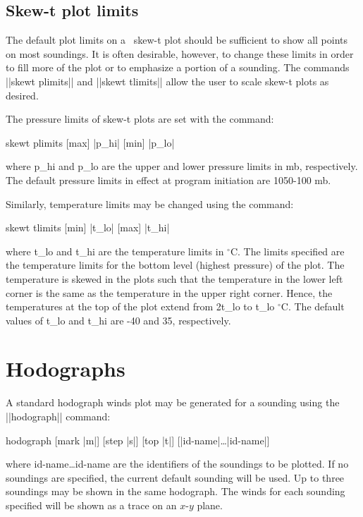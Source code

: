 \subsection{Skew-t plot limits}
The default plot limits on a \suds\ skew-t plot should be sufficient to show
all points on most soundings.  It is often desirable, however, to change these
limits in order to fill more of the plot or to emphasize a portion of a 
sounding.  The commands ||skewt plimits|| and ||skewt tlimits|| allow the 
user to scale skew-t plots as desired.

The pressure limits of skew-t plots are set with the command:
\begin{example}
	skewt plimits [max] |p_hi| [min] |p_lo|
\end{example}
where {\pf p\_hi} and {\pf p\_lo} are the upper and lower pressure limits
in mb, respectively.  The default pressure limits in effect at program
initiation are 1050-100 mb.

Similarly, temperature limits may be changed using the command:
\begin{example}
	skewt tlimits [min] |t_lo| [max] |t_hi|
\end{example}
where {\pf t\_lo} and {\pf t\_hi} are the temperature limits in $^\circ$C.
The limits specified are the temperature limits for the bottom level (highest
pressure) of the plot.  The temperature is skewed in the plots such that 
the temperature in the lower left corner is the same as the temperature in 
the upper right corner.  Hence, the temperatures at the top of the plot extend
from 2{\pf t\_lo} to {\pf t\_lo} $^\circ$C.  The default
values of {\pf t\_lo} and {\pf t\_hi} are -40 and 35, respectively.

\section{Hodographs}
A standard hodograph winds plot may be generated for a sounding using the 
||hodograph|| command:
\begin{example}
	hodograph [mark |m|] [step |s|] [top |t|] [|id-name|\ldots|id-name|]
\end{example}
where {\pf id-name\ldots id-name} are the identifiers of the 
soundings to be plotted.  If no soundings are specified, the current default
sounding will be used.  Up to three soundings may be shown in the same 
hodograph.  The winds for each sounding specified will be shown as a trace 
on an $x$-$y$ plane.

